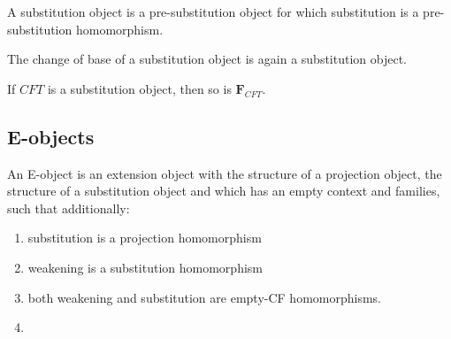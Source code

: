 \begin{defn}
A substitution object is a pre-substitution object for which substitution is
a pre-substitution homomorphism.
\end{defn}

\begin{cor}
The change of base of a substitution object is again a substitution object.
\end{cor}

\begin{cor}
If $CFT$ is a substitution object, then so is $\mathbf{F}_{CFT}$.
\end{cor}

\subsection{E-objects}
\begin{defn}
An E-object is an extension object with the structure of a projection object,
the structure of a substitution object and which has an empty context and families,
such that additionally:
\begin{enumerate}
\item substitution is a projection homomorphism
\item weakening is a substitution homomorphism
\item both weakening and substitution are empty-CF homomorphisms.
\item 
\end{enumerate}
\end{defn}
